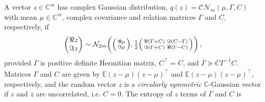 \documentclass[a4paper,10pt,twocolumn]{article}
\newcommand{\cplx}{\mathbb{C}}
\newcommand{\conj}[1]{\overline{#1}}
\begin{document}
A vector $z\in \cplx^m$ has complex Gaussian distribution, $
  q(z) = \mathcal{C}\mathcal{N}_m(\mu, \Gamma, C)
$ with mean $\mu \in \cplx^m$, complex covariance and relation matrices $\Gamma$ and $C$,
respectively, if
\begin{equation}  \label{eq:cn-paired-real-density}
  \begin{pmatrix}
    \Re z \\ \Im z
  \end{pmatrix}
    \sim \mathcal{N}_{2 m}\biggl(
      \Bigl(
        \begin{smallmatrix}
          \Re \mu \\ \Im \mu
        \end{smallmatrix}
      \Bigr),
      \tfrac12 \Bigl(
        \begin{smallmatrix}
          \Re{(\Gamma + C)} & \Im{(C - \Gamma)} \\
          \Im{(\Gamma + C)} & \Re{(\Gamma - C)}
        \end{smallmatrix}
      \Bigr)
    \biggr)
    \,,
\end{equation}
provided $\Gamma$ is positive definite Hermitian matrix, $C^\top = C$, and $
  \conj{\Gamma} \succeq \conj{C} \Gamma^{-1} C
$.
%
Matrices $\Gamma$ and $C$ are given by $
  \mathbb{E} (z - \mu)\conj{(z - \mu)^\top}
$ and $
  \mathbb{E} (z - \mu)(z - \mu)^{\top}
$, respectively, and the random vector $z$ is a \emph{circularly symmetric} $\cplx$-Gaussian
vector if $z$ and $\conj{z}$ are uncorrelated, i.e. $C = 0$.
%
The entropy of $z$ terms of $\Gamma$ and $C$ is
\end{document}
